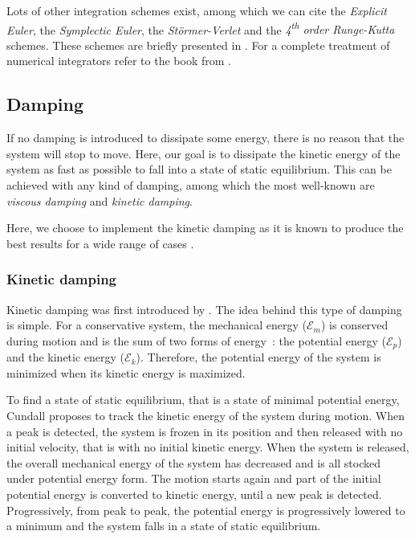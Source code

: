 Lots of other integration schemes exist, among which we can cite the \emph{Explicit Euler}, the \emph{Symplectic Euler}, the \emph{Störmer-Verlet} and the \emph{4\textsuperscript{th} order Runge-Kutta} schemes. These schemes are briefly presented in \cite{Fierz2013}. For a complete treatment of numerical integrators refer to the book from .

\subsection{Damping}\label{sec=damping}
If no damping is introduced to dissipate some energy, there is no reason that the system will stop to move. Here, our goal is to dissipate the kinetic energy of the system as fast as possible to fall into a state of static equilibrium. This can be achieved with any kind of damping, among which the most well-known are \emph{viscous damping} and \emph{kinetic damping}.

Here, we choose to implement the kinetic damping as it is known to produce the best results for a wide range of cases \cite{Rezaiee2012}.

\subsubsection{Kinetic damping}
Kinetic damping was first introduced by . The idea behind this type of damping is simple. For a conservative system, the mechanical energy ($\mathcal{E}_m$) is conserved during motion and is the sum of two forms of energy~: the potential energy ($\mathcal{E}_p$) and the kinetic energy ($\mathcal{E}_k$). Therefore, the potential energy of the system is minimized when its kinetic energy is maximized.

To find a state of static equilibrium, that is a state of minimal potential energy, Cundall proposes to track the kinetic energy of the system during motion. When a peak is detected, the system is frozen in its position and then released with no initial velocity, that is with no initial kinetic energy. When the system is released, the overall mechanical energy of the system has decreased and is all stocked under potential energy form. The motion starts again and part of the initial potential energy is converted to kinetic energy, until a new peak is detected. Progressively, from peak to peak, the potential energy is progressively lowered to a minimum and the system falls in a state of static equilibrium.

